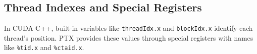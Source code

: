 \subsection{Thread Indexes and Special Registers}

In CUDA C++, built-in variables like \texttt{threadIdx.x} and \texttt{blockIdx.x} identify each thread's position. PTX provides these values through special registers with names like \texttt{\%tid.x} and \texttt{\%ctaid.x}.

